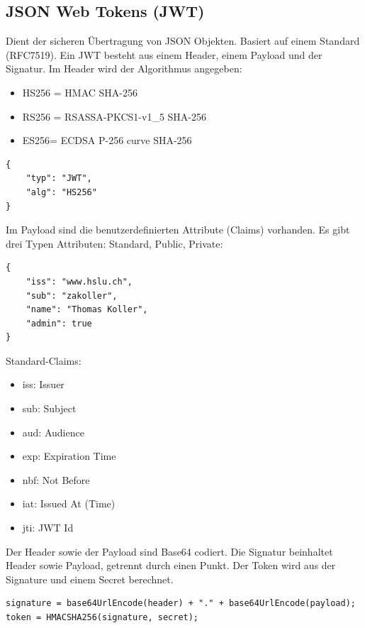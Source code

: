 \subsection{JSON Web Tokens (JWT)}

Dient der sicheren Übertragung von JSON Objekten. Basiert auf einem Standard (RFC7519). Ein JWT besteht aus einem Header,  einem Payload und der Signatur. Im Header wird der Algorithmus angegeben:
\begin{itemize}
	\item HS256 = HMAC SHA-256
	\item RS256 = RSASSA-PKCS1-v1\_5 SHA-256
	\item ES256= ECDSA P-256 curve SHA-256
\end{itemize}

\begin{lstlisting}[caption=JWT Header]
{
	"typ": "JWT",
	"alg": "HS256"
}
\end{lstlisting}

\newpage

Im Payload sind die benutzerdefinierten Attribute (Claims) vorhanden. Es gibt drei Typen Attributen: Standard, Public, Private:

\begin{lstlisting}[caption=JWT Payload]
{
	"iss": "www.hslu.ch",
	"sub": "zakoller",
	"name": "Thomas Koller",
	"admin": true
}
\end{lstlisting}

Standard-Claims:
\begin{itemize}
	\item iss: Issuer
	\item sub: Subject
	\item aud: Audience
	\item exp: Expiration Time
	\item nbf: Not Before
	\item iat: Issued At (Time)
	\item jti: JWT Id
\end{itemize}

Der Header sowie der Payload sind Base64 codiert. Die Signatur beinhaltet Header sowie Payload, getrennt durch einen Punkt. Der Token wird aus der Signature und einem Secret berechnet.

\begin{lstlisting}[caption=JWT Signature]
signature = base64UrlEncode(header) + "." + base64UrlEncode(payload);
token = HMACSHA256(signature, secret);
\end{lstlisting}

